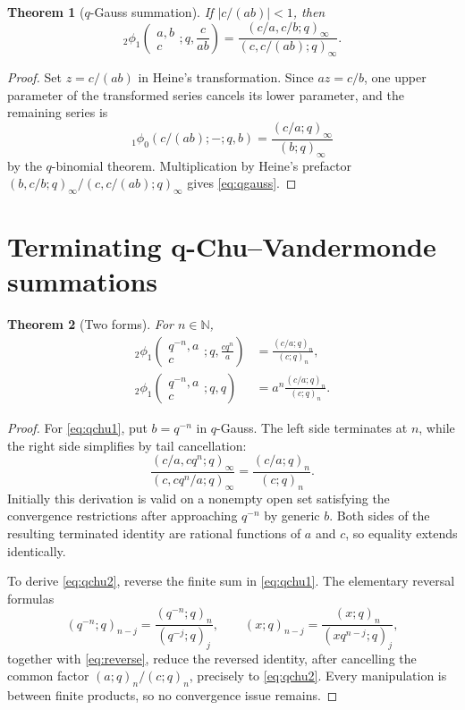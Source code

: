 \documentclass[11pt]{article}
\numberwithin{equation}{section}
\newtheorem{theorem}{Theorem}[section]
\theoremstyle{definition}
\newcommand{\N}{\mathbb N}
\begin{document}
\begin{theorem}[$q$-Gauss summation]
If $|c/(ab)|<1$, then
\begin{equation}
{}_2\phi_1\!\left(\begin{matrix}a,b\\c\end{matrix};q,\frac{c}{ab}\right)
=\frac{(c/a,c/b;q)_\infty}{(c,c/(ab);q)_\infty}.
\label{eq:qgauss}
\end{equation}
\end{theorem}
\begin{proof}
Set $z=c/(ab)$ in Heine's transformation.  Since $az=c/b$, one upper parameter of the transformed series cancels its lower parameter, and the remaining series is
\[
{}_1\phi_0\!\left(c/(ab);-;q,b\right)
=\frac{(c/a;q)_\infty}{(b;q)_\infty}
\]
by the $q$-binomial theorem.  Multiplication by Heine's prefactor $(b,c/b;q)_\infty/(c,c/(ab);q)_\infty$ gives \eqref{eq:qgauss}.
\end{proof}

\section{Terminating q-Chu--Vandermonde summations}
\begin{theorem}[Two forms]
For $n\in\N$,
\begin{align}
{}_2\phi_1\!\left(\begin{matrix}q^{-n},a\\c\end{matrix};q,\frac{cq^n}{a}\right)
&=\frac{(c/a;q)_n}{(c;q)_n},\label{eq:qchu1}\\
{}_2\phi_1\!\left(\begin{matrix}q^{-n},a\\c\end{matrix};q,q\right)
&=a^n\frac{(c/a;q)_n}{(c;q)_n}.\label{eq:qchu2}
\end{align}
\end{theorem}
\begin{proof}
For \eqref{eq:qchu1}, put $b=q^{-n}$ in $q$-Gauss.  The left side terminates at $n$, while the right side simplifies by tail cancellation:
\[
\frac{(c/a,cq^n;q)_\infty}{(c,cq^n/a;q)_\infty}
=\frac{(c/a;q)_n}{(c;q)_n}.
\]
Initially this derivation is valid on a nonempty open set satisfying the convergence restrictions after approaching $q^{-n}$ by generic $b$.  Both sides of the resulting terminated identity are rational functions of $a$ and $c$, so equality extends identically.

To derive \eqref{eq:qchu2}, reverse the finite sum in \eqref{eq:qchu1}.  The elementary reversal formulas
\[
(q^{-n};q)_{n-j}=\frac{(q^{-n};q)_n}{(q^{-j};q)_j},
\qquad
(x;q)_{n-j}=\frac{(x;q)_n}{(xq^{n-j};q)_j},
\]
together with \eqref{eq:reverse}, reduce the reversed identity, after cancelling the common factor $(a;q)_n/(c;q)_n$, precisely to \eqref{eq:qchu2}.  Every manipulation is between finite products, so no convergence issue remains.
\end{proof}
\end{document}
